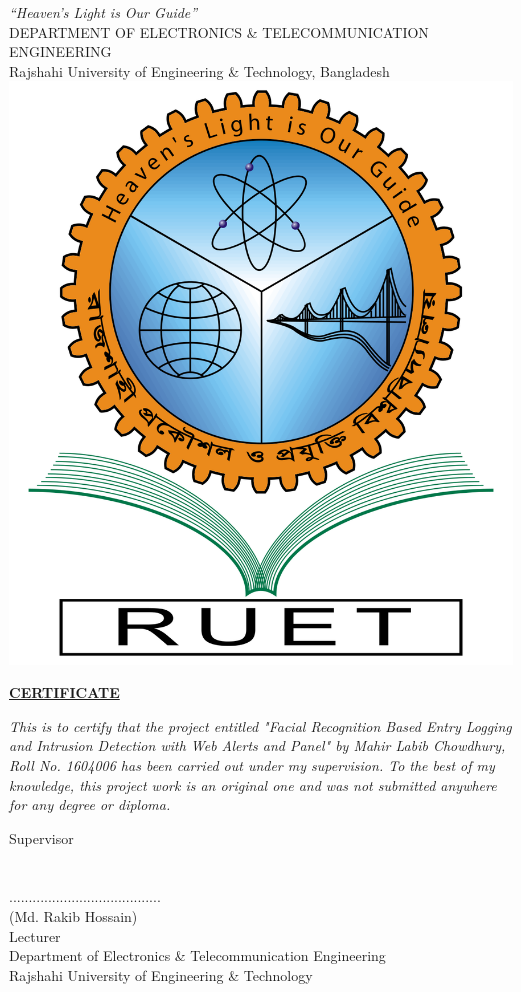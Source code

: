 \begin{center}
{\textit{``Heaven's Light is Our Guide''}}\\
{\small DEPARTMENT OF ELECTRONICS \& TELECOMMUNICATION ENGINEERING}\\ 
{\large Rajshahi University of Engineering \& Technology, Bangladesh}\\[0.5cm] 
\includegraphics[scale=.15]{images/ruet_logo.png}
\\[0.2 cm] \par
\large {\textbf{\underline{CERTIFICATE}}}\\[1cm] \par
\end{center}
\emph{\normalsize {This is to certify that the project entitled "Facial Recognition Based Entry Logging and Intrusion Detection with Web Alerts and Panel" by Mahir Labib Chowdhury, Roll No. 1604006 has been carried out under my supervision. To the best of my knowledge, this project work is an original one and was not submitted anywhere for any degree or diploma.}}

\vspace{10mm}

\hspace{-7mm} Supervisor
\\
\\
\\
.......................................
\\
(Md. Rakib Hossain)\\
Lecturer\\
Department of Electronics \& Telecommunication Engineering\\
Rajshahi University of Engineering \& Technology
\pagebreak